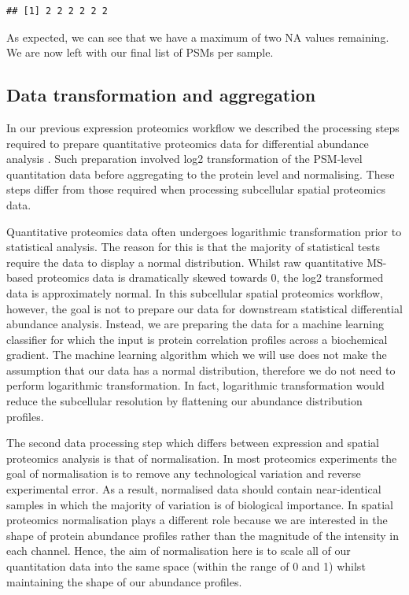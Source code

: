 \documentclass[9pt,a4paper,]{extarticle}
\begin{document}
\begin{verbatim}
## [1] 2 2 2 2 2 2
\end{verbatim}

As expected, we can see that we have a maximum of two NA values remaining. We are
now left with our final list of PSMs per sample.

\subsection{Data transformation and aggregation}\label{data-transformation-and-aggregation}

In our previous expression proteomics workflow we described the processing steps
required to prepare quantitative proteomics data for differential abundance
analysis \citep{Hutchings2023}. Such preparation involved log2 transformation of the
PSM-level quantitation data before aggregating to the protein level and
normalising. These steps differ from those required when processing subcellular
spatial proteomics data.

Quantitative proteomics data often undergoes logarithmic transformation prior to
statistical analysis. The reason for this is that the majority of statistical
tests require the data to display a normal distribution. Whilst raw quantitative
MS-based proteomics data is dramatically skewed towards 0, the log2 transformed
data is approximately normal. In this subcellular spatial proteomics workflow,
however, the goal is not to prepare our data for downstream statistical differential
abundance analysis. Instead, we are preparing the data for a machine learning
classifier for which the input is protein correlation profiles across a
biochemical gradient. The machine learning algorithm which we will use does
not make the assumption that our data has a normal distribution, therefore we
do not need to perform logarithmic transformation. In fact, logarithmic
transformation would reduce the subcellular resolution by flattening our abundance
distribution profiles.

The second data processing step which differs between expression and spatial
proteomics analysis is that of normalisation. In most proteomics experiments the
goal of normalisation is to remove any technological variation and reverse
experimental error. As a result, normalised data should contain near-identical
samples in which the majority of variation is of biological importance. In spatial
proteomics normalisation plays a different role because we are interested in the
shape of protein abundance profiles rather than the magnitude of the intensity in
each channel. Hence, the aim of normalisation here is to scale all of our
quantitation data into the same space (within the range of 0 and 1) whilst
maintaining the shape of our abundance profiles.
\end{document}
